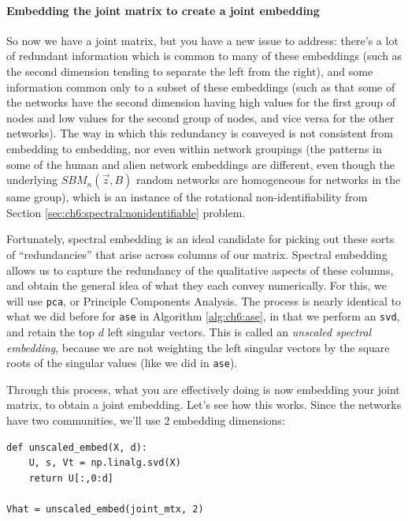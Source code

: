 \paragraph{Embedding the joint matrix to create a joint embedding}

So now we have a joint matrix, but you have a new issue to address: there's a lot of redundant information which is common to many of these embeddings (such as the second dimension tending to separate the left from the right), and some information common only to a subset of these embeddings (such as that some of the networks have the second dimension having high values for the first group of nodes and low values for the second group of nodes, and vice versa for the other networks). The way in which this redundancy is conveyed is not consistent from embedding to embedding, nor even within network groupings (the patterns in some of the human and alien network embeddings are different, even though the underlying $SBM_n(\vec z, B)$ random networks are homogeneous for networks in the same group), which is an instance of the rotational non-identifiability from Section \ref{sec:ch6:spectral:nonidentifiable} problem.

Fortunately, spectral embedding is an ideal candidate for picking out these sorts of ``redundancies'' that arise across columns of our matrix. Spectral embedding allows us to capture the redundancy of the qualitative aspects of these columns, and obtain the general idea of what they each convey numerically. For this, we will use \texttt{pca}, or Principle Components Analysis. The process is nearly identical to what we did before for \texttt{ase} in Algorithm \ref{alg:ch6:ase}, in that we perform an \texttt{svd}, and retain the top $d$ left singular vectors. This is called an \textit{unscaled spectral embedding}, because we are not weighting the left singular vectors by the square roots of the singular values (like we did in \texttt{ase}).

Through this process, what you are effectively doing is now embedding your joint matrix, to obtain a joint embedding. Let's see how this works. Since the networks have two communities, we'll use $2$ embedding dimensions:

\begin{lstlisting}[style=python]
def unscaled_embed(X, d):
    U, s, Vt = np.linalg.svd(X)
    return U[:,0:d]

Vhat = unscaled_embed(joint_mtx, 2)
\end{lstlisting}

